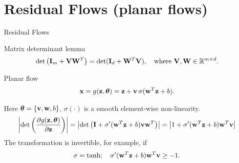 \section{Residual Flows (planar flows)}
\begin{frame}{Residual Flows}
	\begin{block}{Matrix determinant lemma}
		\vspace{-0.5cm}
		\[
		\det \left( \mathbf{I}_m + \mathbf{V} \mathbf{W}^T \right) = \det ( \mathbf{I}_d + \mathbf{W}^T \mathbf{V} ), \quad \text{where } \mathbf{V}, \mathbf{W} \in \mathbb{R}^{m \times d}.
		\]
		\vspace{-0.5cm}
	\end{block}
	\begin{block}{Planar flow}
		\vspace{-0.2cm}
		\[
		\mathbf{x} = g(\mathbf{z}, \boldsymbol{\theta}) = \mathbf{z} + \mathbf{v} \, \sigma(\mathbf{w}^T\mathbf{z} + b).
		\]
		\vspace{-0.3cm}
	\end{block}
	Here $\boldsymbol{\theta} = \{\mathbf{v}, \mathbf{w}, b\}$, $\sigma(\cdot)$ is a smooth element-wise non-linearity.
	{\small
		\[
		\left| \det \left( \frac{\partial g(\mathbf{z}, \boldsymbol{\theta})}{\partial \mathbf{z}} \right)\right| = \left| \det \left( \mathbf{I} + \sigma'(\mathbf{w}^T \mathbf{z} + b) \mathbf{v} \mathbf{w}^T\right) \right| = \left| 1 + \sigma'(\mathbf{w}^T \mathbf{z} + b) \mathbf{w}^T \mathbf{v} \right|
		\]}
	The transformation is invertible, for example, if
	\[
	\sigma = \tanh; \quad \sigma'(\mathbf{w}^T \mathbf{z} + b) \mathbf{w}^T \mathbf{v} \geq -1.
	\]
\end{frame}
